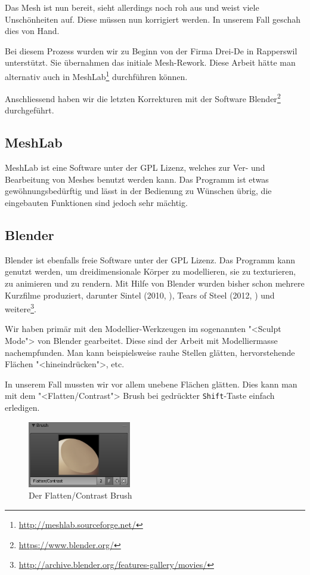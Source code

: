 \label{workflow:mesh-cleanup}

Das Mesh ist nun bereit, sieht allerdings noch roh aus und weist viele
Unschönheiten auf. Diese müssen nun korrigiert werden. In unserem Fall geschah
dies von Hand.

Bei diesem Prozess wurden wir zu Beginn von der Firma Drei-De in Rapperswil
unterstützt. Sie übernahmen das initiale Mesh-Rework. Diese Arbeit hätte man
alternativ auch in MeshLab\footnote{\url{http://meshlab.sourceforge.net/}}
durchführen können.

Anschliessend haben wir die letzten Korrekturen mit der Software
Blender\footnote{\url{https://www.blender.org/}} durchgeführt.

\subsection{MeshLab}

MeshLab ist eine Software unter der GPL Lizenz, welches zur Ver- und Bearbeitung
von Meshes benutzt werden kann. Das Programm ist etwas gewöhnungsbedürftig und
lässt in der Bedienung zu Wünschen übrig, die eingebauten Funktionen sind jedoch
sehr mächtig.

\subsection{Blender}

Blender ist ebenfalls freie Software unter der GPL Lizenz. Das Programm kann
genutzt werden, um dreidimensionale Körper zu modellieren, sie zu texturieren,
zu animieren und zu rendern. Mit Hilfe von Blender wurden bisher schon mehrere
Kurzfilme produziert, darunter Sintel (2010, \cite{sintel}), Tears of Steel
(2012, \cite{tearsofsteel}) und
weitere\footnote{\url{http://archive.blender.org/features-gallery/movies/}}.

Wir haben primär mit den Modellier-Werkzeugen im sogenannten "<Sculpt Mode"> von
Blender gearbeitet. Diese sind der Arbeit mit Modelliermasse nachempfunden. Man
kann beispielsweise rauhe Stellen glätten, hervorstehende Flächen
"<hineindrücken">, etc. 

In unserem Fall mussten wir vor allem unebene Flächen glätten. Dies kann man mit
dem "<Flatten/Contrast"> Brush bei gedrückter \texttt{Shift}-Taste einfach
erledigen.

\begin{figure}[H]
	\centering
	\includegraphics[width=0.4\textwidth]{images/blender_flatten_brush.png}
	\caption{Der Flatten/Contrast Brush}
	\label{img:blender_brush}
\end{figure}

